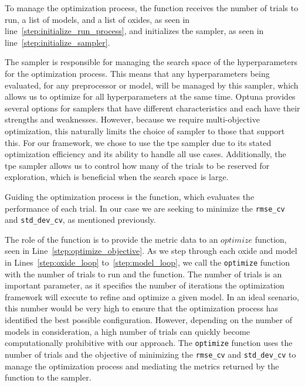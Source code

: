 To manage the optimization process, the function receives the number of trials to run, a list of models, and a list of oxides, as seen in line~\ref{step:initialize_run_process}, and initializes the sampler, as seen in line~\ref{step:initialize_sampler}.

The sampler is responsible for managing the search space of the hyperparameters for the optimization process.
This means that any hyperparameters being evaluated, for any preprocessor or model, will be managed by this sampler, which allows us to optimize for all hyperparameters at the same time.
Optuna provides several options for samplers that have different characteristics and each have their strengths and weaknesses.
However, because we require multi-objective optimization, this naturally limits the choice of sampler to those that support this.
For our framework, we chose to use the \gls{tpe} sampler due to its stated optimization efficiency and its ability to handle all use cases.
Additionally, the \gls{tpe} sampler allows us to control how many of the trials to be reserved for exploration, which is beneficial when the search space is large\cite{optuna_2019}.

Guiding the optimization process is the  function, which evaluates the performance of each trial.
In our case we are seeking to minimize the \texttt{rmse\_cv} and \texttt{std\_dev\_cv}, as mentioned previously.

The role of the  function is to provide the metric data to an $optimize$ function, seen in Line~\ref{step:optimize_objective}.
As we step through each oxide and model in Lines~\ref{step:oxide_loop} to~\ref{step:model_loop}, we call the \texttt{optimize} function with the number of trials to run and the  function.
The number of trials is an important parameter, as it specifies the number of iterations the optimization framework will execute to refine and optimize a given model.
In an ideal scenario, this number would be very high to ensure that the optimization process has identified the best possible configuration.
However, depending on the number of models in consideration, a high number of trials can quickly become computationally prohibitive with our approach.
The \texttt{optimize} function uses the number of trials and the objective of minimizing the \texttt{rmse\_cv} and \texttt{std\_dev\_cv} to manage the optimization process and mediating the metrics returned by the  function to the sampler.

